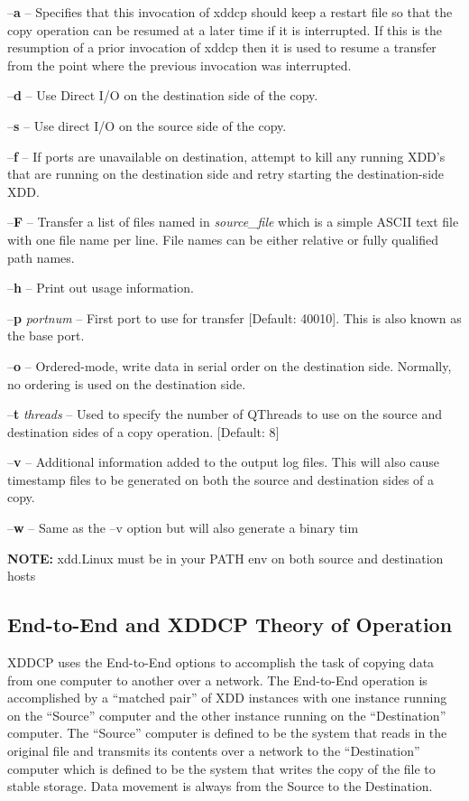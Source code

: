 --\textbf{a} -- Specifies that this invocation of xddcp should keep a restart file so that the copy operation can be resumed at a later time if it is interrupted. If this is the resumption of a prior invocation of xddcp then it is used to resume a transfer from the point where the previous invocation was interrupted.

--\textbf{d} -- Use Direct I/O on the destination side of the copy.

--\textbf{s} -- Use direct I/O on the source side of the copy.

--\textbf{f} -- If ports are unavailable on destination, attempt to kill any running XDD's that are running on the destination side and retry starting the destination-side XDD.

--\textbf{F} -- Transfer a list of files named in \emph{source\_file} which is a simple ASCII text file with one file name per line. File names can be either relative or fully qualified path names.

--\textbf{h} -- Print out usage information.

--\textbf{p} \emph{portnum} -- First port to use for transfer {[}Default: 40010{]}. This is also known as the base port.

--\textbf{o} -- Ordered-mode, write data in serial order on the destination side. Normally, no ordering is used on the destination side.

--\textbf{t} \emph{threads} -- Used to specify the number of QThreads to use on the source and destination sides of a copy operation. {[}Default: 8{]}

--\textbf{v} -- Additional information added to the output log files. This will also cause timestamp files to be generated on both the source and destination sides of a copy.

--\textbf{w} -- Same as the --v option but will also generate a binary tim

\textbf{NOTE:} \textquotesingle xdd.Linux\textquotesingle{} must be in your PATH env on both source and destination hosts

\subsection{End-to-End and XDDCP Theory of Operation}\label{end-to-end-and-xddcp-theory-of-operation}

XDDCP uses the End-to-End options to accomplish the task of copying data from one computer to another over a network. The End-to-End operation is accomplished by a ``matched pair'' of XDD instances with one instance running on the ``Source'' computer and the other instance running on the ``Destination'' computer. The ``Source'' computer is defined to be the system that reads in the original file and transmits its contents over a network to the ``Destination'' computer which is defined to be the system that writes the copy of the file to stable storage. Data movement is always from the Source to the Destination.

